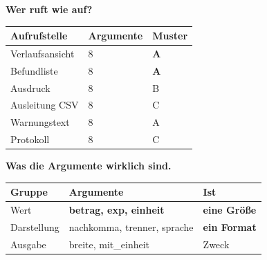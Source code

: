 \begin{merksatz}
\textbf{Wer ruft wie auf?}

\begin{center}
{\small
\renewcommand{\arraystretch}{1.45}
\begin{tabular}{@{}P{2.8cm}P{2.4cm}P{2.6cm}@{}}
\toprule
\textbf{Aufrufstelle} & \textbf{Argumente} & \textbf{Muster}\\
\midrule
Verlaufsansicht & $8$ & \textbf{A}\\
Befundliste & $8$ & \textbf{A}\\
Ausdruck & $8$ & \textcolor{mittel}{B}\\
Ausleitung CSV & $8$ & \textcolor{akzent}{C}\\
Warnungstext & $8$ & A\\
Protokoll & $8$ & \textcolor{akzent}{C}\\
\bottomrule
\end{tabular}}
\end{center}

\begin{center}
\begin{minipage}{0.88\textwidth}
\end{minipage}
\end{center}

\textbf{Was die Argumente wirklich sind.}

\begin{center}
\renewcommand{\arraystretch}{1.45}
\begin{tabular}{@{}P{2.8cm}P{2.4cm}P{2.6cm}@{}}
\toprule
\textbf{Gruppe} & \textbf{Argumente} & \textbf{Ist} \\
\midrule
Wert & \textbf{betrag, exp, einheit} & \textbf{eine Größe}\\
Darstellung & nachkomma, trenner, sprache & \textbf{ein Format}\\
Ausgabe & breite, mit\_einheit & Zweck\\
\bottomrule
\end{tabular}
\end{center}

\begin{center}
\end{center}
\end{merksatz}

